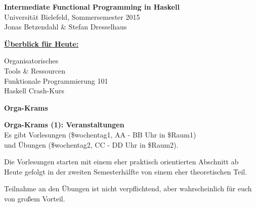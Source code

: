 \documentclass{beamer}
\begin{document}
  

  \begin{frame}
  \begin{center}
    \Huge\textbf{Intermediate Functional Programming in Haskell}\\ \bigskip
    \LARGE Universität Bielefeld, Sommersemester 2015\\ \bigskip
    \large Jonas Betzendahl \& Stefan Dresselhaus
    \end{center}
  \end{frame}

  
\begin{frame}
\begin{center}
	\Large\textbf{\underline{Überblick für Heute:}}\\ \bigskip\bigskip\normalsize
	
	Organisatorisches\\\bigskip
	Tools \& Ressourcen\\\bigskip
	Funktionale Programmierung 101\\\bigskip
	Haskell Crash-Kurs
    \end{center}
\end{frame}

  
  \begin{frame}

    \begin{center}
    \Large\textbf{Orga-Krams}
    \end{center}
  \end{frame}

  
  \begin{frame}
    \begin{center}
    \Large\textbf{Orga-Krams (1): Veranstaltungen}\\ \bigskip \normalsize
    Es gibt Vorlesungen (\$wochentag1, AA - BB Uhr in \$Raum1)\\
    und Übungen (\$wochentag2, CC - DD Uhr in \$Raum2).\bigskip

	Die Vorlesungen starten mit einem eher praktisch orientierten Abschnitt ab Heute gefolgt in der zweiten Semesterhälfte von einem eher theoretischen Teil.\bigskip
	
	Teilnahme an den Übungen ist nicht verpflichtend, aber wahrscheinlich für euch von großem Vorteil.  
    \end{center}
  \end{frame}
  
\end{document}
